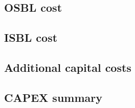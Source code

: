 \subsection{OSBL cost}
\subsection{ISBL cost}
\subsection{Additional capital costs}
\subsection{CAPEX summary}